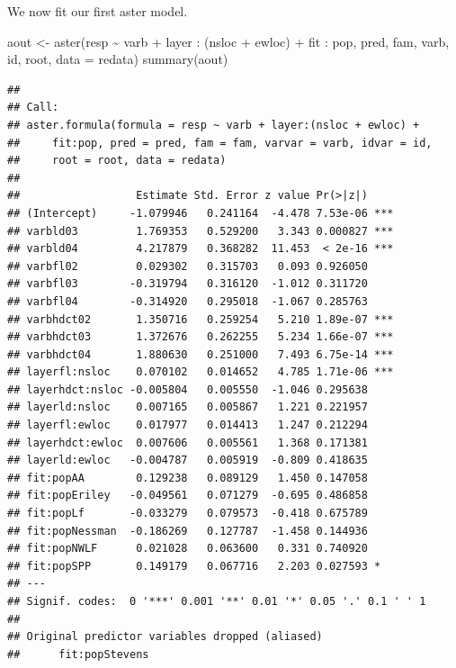 \documentclass[
  ignorenonframetext,
]{beamer}
\newenvironment{Shaded}{\begin{snugshade}}{\end{snugshade}}
\newcommand{\AttributeTok}[1]{\textcolor[rgb]{0.77,0.63,0.00}{#1}}
\newcommand{\FunctionTok}[1]{\textcolor[rgb]{0.00,0.00,0.00}{#1}}
\newcommand{\NormalTok}[1]{#1}
\newcommand{\OtherTok}[1]{\textcolor[rgb]{0.56,0.35,0.01}{#1}}
\newcommand{\SpecialCharTok}[1]{\textcolor[rgb]{0.00,0.00,0.00}{#1}}
\begin{document}
\begin{frame}[fragile]{}
\protect\hypertarget{section-19}{}
We now fit our first aster model.

\vspace{12pt}
\tiny

\begin{Shaded}
\begin{Highlighting}[]
\NormalTok{aout }\OtherTok{\textless{}{-}} \FunctionTok{aster}\NormalTok{(resp }\SpecialCharTok{\textasciitilde{}}\NormalTok{ varb }\SpecialCharTok{+}\NormalTok{ layer }\SpecialCharTok{:}\NormalTok{ (nsloc }\SpecialCharTok{+}\NormalTok{ ewloc) }\SpecialCharTok{+} 
\NormalTok{                            fit }\SpecialCharTok{:}\NormalTok{ pop, pred, fam, varb, id, root, }\AttributeTok{data =}\NormalTok{ redata)}
\FunctionTok{summary}\NormalTok{(aout)}
\end{Highlighting}
\end{Shaded}

\begin{verbatim}
## 
## Call:
## aster.formula(formula = resp ~ varb + layer:(nsloc + ewloc) + 
##     fit:pop, pred = pred, fam = fam, varvar = varb, idvar = id, 
##     root = root, data = redata)
## 
##                  Estimate Std. Error z value Pr(>|z|)    
## (Intercept)     -1.079946   0.241164  -4.478 7.53e-06 ***
## varbld03         1.769353   0.529200   3.343 0.000827 ***
## varbld04         4.217879   0.368282  11.453  < 2e-16 ***
## varbfl02         0.029302   0.315703   0.093 0.926050    
## varbfl03        -0.319794   0.316120  -1.012 0.311720    
## varbfl04        -0.314920   0.295018  -1.067 0.285763    
## varbhdct02       1.350716   0.259254   5.210 1.89e-07 ***
## varbhdct03       1.372676   0.262255   5.234 1.66e-07 ***
## varbhdct04       1.880630   0.251000   7.493 6.75e-14 ***
## layerfl:nsloc    0.070102   0.014652   4.785 1.71e-06 ***
## layerhdct:nsloc -0.005804   0.005550  -1.046 0.295638    
## layerld:nsloc    0.007165   0.005867   1.221 0.221957    
## layerfl:ewloc    0.017977   0.014413   1.247 0.212294    
## layerhdct:ewloc  0.007606   0.005561   1.368 0.171381    
## layerld:ewloc   -0.004787   0.005919  -0.809 0.418635    
## fit:popAA        0.129238   0.089129   1.450 0.147058    
## fit:popEriley   -0.049561   0.071279  -0.695 0.486858    
## fit:popLf       -0.033279   0.079573  -0.418 0.675789    
## fit:popNessman  -0.186269   0.127787  -1.458 0.144936    
## fit:popNWLF      0.021028   0.063600   0.331 0.740920    
## fit:popSPP       0.149179   0.067716   2.203 0.027593 *  
## ---
## Signif. codes:  0 '***' 0.001 '**' 0.01 '*' 0.05 '.' 0.1 ' ' 1
## 
## Original predictor variables dropped (aliased)
##      fit:popStevens
\end{verbatim}
\end{frame}
\end{document}
